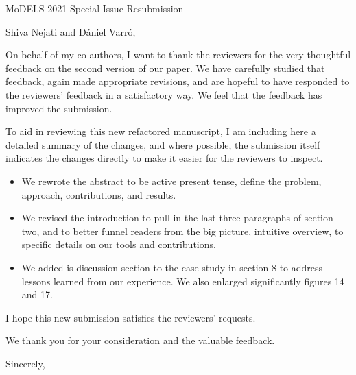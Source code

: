 \documentclass[10pt]{byu-cs}
\begin{document}
\pagestyle{headings}

\signature{Eric G Mercer\\
           Associate Professor}

\begin{letter}{MoDELS 2021 Special Issue Resubmission}

\date{\today}

\opening{Shiva Nejati and D\'{a}niel Varr\'{o},}

On behalf of my co-authors, I want to thank the reviewers for the very thoughtful feedback on the second version of our paper.
We have carefully studied that feedback, again made appropriate revisions, and are hopeful to have responded to the reviewers' feedback in a satisfactory way.
We feel that the feedback has improved the submission.

To aid in reviewing this new refactored manuscript, I am including here a detailed summary of the changes, and where possible, the submission itself indicates the changes directly to make it easier for the reviewers to inspect.
\begin{itemize}
  \item We rewrote the abstract to be active present tense, define the problem, approach, contributions, and results.
  \item We revised the introduction to pull in the last three paragraphs of section two, and to better funnel readers from the big picture, intuitive overview, to specific details on our tools and contributions. 
  \item We added is discussion section to the case study in section 8 to address lessons learned from our experience. We also enlarged significantly figures 14 and 17.
\end{itemize}

I hope this new submission satisfies the reviewers' requests.

We thank you for your consideration and the valuable feedback.

\closing{Sincerely,}

\end{letter}
\end{document}
